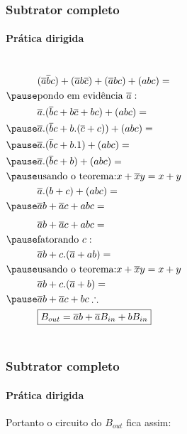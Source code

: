 \begin{frame}
	\frametitle{Subtrator completo}
	\framesubtitle{\textbf{Prática dirigida}}
	\begin{columns}
		\begin{equation}
			\begin{aligned}
			&(\overline{a}\overline{b}c)+(\overline{a}b\overline{c})+(\overline{a}bc)+(abc) = \\ \pause
			&\text{pondo em evidência } \overline{a}: \\
			&\overline{a}.(\overline{b}c+b\overline{c}+bc)+(abc) =\\  \pause
			&\overline{a}.(\overline{b}c+ b.(\overline{c}+c))+(abc) =\\  \pause
			&\overline{a}.(\overline{b}c+ b.1)+(abc) =\\  \pause
			&\overline{a}.(\overline{b}c+ b)+(abc) =\\  \pause
			&\text{usando o teorema:} x+\overline{x}y = x+y \\
			&\overline{a}.(b+c)+(abc) =\\  \pause
			&\overline{a}b+\overline{a}c+abc =\\
			\end{aligned}
		\end{equation}
		\begin{equation}
			\begin{aligned}
				&\overline{a}b+\overline{a}c+abc =\\  \pause
				&\text{fatorando } c: \\
				&\overline{a}b+c.(\overline{a}+ab) = \\  \pause
				&\text{usando o teorema:} x+\overline{x}y = x+y \\
				&\overline{a}b+c.(\overline{a}+b) = \\  \pause
				&\overline{a}b+\overline{a}c+bc \therefore \\ 
				&\boxed{B_{out}=\overline{a}b+\overline{a}B_{in}+bB_{in}}
			\end{aligned}
		\end{equation}
	\end{columns}
\end{frame}

\begin{frame}
	\frametitle{Subtrator completo}
	\framesubtitle{\textbf{Prática dirigida}}
	\par Portanto o circuito do $B_{out}$ fica assim:
	\begin{figure}
		\centering
		
		\label{fig:subtratorcompletoparte02}
	\end{figure}
\end{frame}

